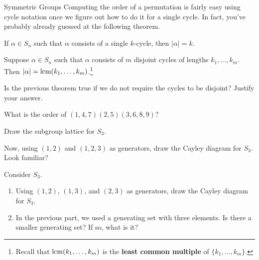 \begin{section}{Symmetric Groups}
Computing the order of a permutation is fairly easy using cycle notation once we figure out how to do it for a single cycle.  In fact, you've probably already guessed at the following theorem.

\begin{theorem}
If $\alpha\in S_n$ such that $\alpha$ consists of a single $k$-cycle, then $|\alpha|=k$.
\end{theorem}

\begin{theorem}
Suppose $\alpha\in S_n$ such that $\alpha$ consists of $m$ disjoint cycles of lengths $k_1,\ldots, k_m$.  Then $|\alpha|=\operatorname{lcm}(k_1,\ldots, k_m)$.\footnote{Recall that $\operatorname{lcm}(k_1,\ldots, k_m)$ is the \textbf{least common multiple} of $\{k_1,\ldots, k_m\}$.} 
\end{theorem}

\begin{problem}
Is the previous theorem true if we do not require the cycles to be disjoint?  Justify your answer.
\end{problem}

\begin{problem}
What is the order of $(1,4,7)(2,5)(3,6,8,9)$?
\end{problem}

\begin{problem}
Draw the subgroup lattice for $S_3$.
\end{problem}

\begin{problem}
Now, using $(1,2)$ and $(1,2,3)$ as generators, draw the Cayley diagram for $S_3$.  Look familiar?
\end{problem}

\begin{problem}
Consider $S_3$.
\begin{enumerate}[label=\rm{(\alph*)}]
\item Using $(1,2)$, $(1,3)$, and $(2,3)$ as generators, draw the Cayley diagram for $S_3$.
\item In the previous part, we used a generating set with three elements.  Is there a smaller generating set?  If so, what is it?
\end{enumerate}
\end{problem}


\end{section}
